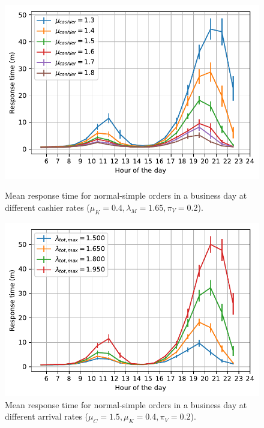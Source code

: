 \begin{figure}
  \begin{minipage}{0.48\textwidth}
    \centering
    \includegraphics[width=\textwidth]{figs/business_day/varying_cashier_rate.pdf}
    \caption{Mean response time for normal-simple orders in a business day at different cashier rates ($\mu_K=0.4, \lambda_{M} = 1.65, \pi_V=0.2$).}
    \label{fig:bd:var_cr}
  \end{minipage}\hspace{0.03\textwidth}
  \begin{minipage}{0.48\textwidth}
    \centering
    \includegraphics[width=\textwidth]{figs/business_day/varying_arrival_rate.pdf}
    \caption{Mean response time for normal-simple orders in a business day at different arrival rates ($\mu_C = 1.5, \mu_K=0.4, \pi_V=0.2$).}
    \label{fig:bd:var_ar}
  \end{minipage}
\end{figure}


